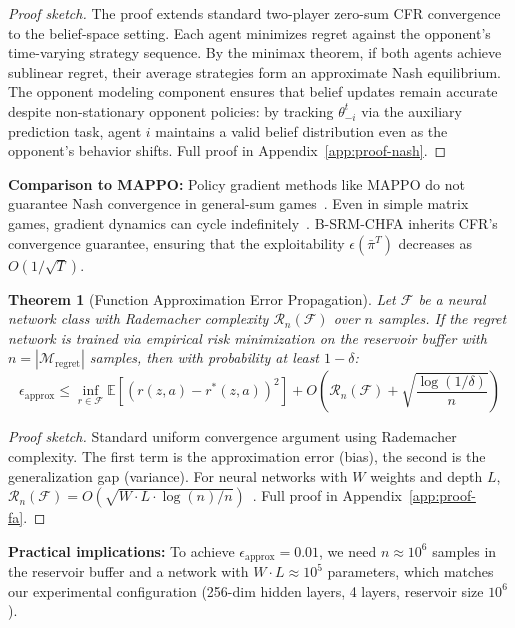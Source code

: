 \documentclass{article}
\newtheorem{theorem}{Theorem}[section]
\begin{document}
\begin{proof}[Proof sketch]
The proof extends standard two-player zero-sum CFR convergence~\cite{zinkevich2007regret} to the belief-space setting. Each agent minimizes regret against the opponent's time-varying strategy sequence. By the minimax theorem, if both agents achieve sublinear regret, their average strategies form an approximate Nash equilibrium. The opponent modeling component ensures that belief updates remain accurate despite non-stationary opponent policies: by tracking $\theta_{-i}^t$ via the auxiliary prediction task, agent $i$ maintains a valid belief distribution even as the opponent's behavior shifts. Full proof in Appendix~\ref{app:proof-nash}.
\end{proof}

\textbf{Comparison to MAPPO:} Policy gradient methods like MAPPO do not guarantee Nash convergence in general-sum games~\cite{daskalakis2020complexity}. Even in simple matrix games, gradient dynamics can cycle indefinitely~\cite{balduzzi2018mechanics}. B-SRM-CHFA inherits CFR's convergence guarantee, ensuring that the exploitability $\epsilon(\bar{\pi}^T)$ decreases as $O(1/\sqrt{T})$.

\begin{theorem}[Function Approximation Error Propagation]
\label{thm:fa-error}
Let $\mathcal{F}$ be a neural network class with Rademacher complexity $\mathcal{R}_n(\mathcal{F})$ over $n$ samples. If the regret network is trained via empirical risk minimization on the reservoir buffer with $n = |\mathcal{M}_{\text{regret}}|$ samples, then with probability at least $1 - \delta$:
\begin{equation}
\epsilon_{\text{approx}} \leq \inf_{r \in \mathcal{F}} \mathbb{E}[(r(z,a) - r^*(z,a))^2] + O\left(\mathcal{R}_n(\mathcal{F}) + \sqrt{\frac{\log(1/\delta)}{n}}\right)
\end{equation}
\end{theorem}

\begin{proof}[Proof sketch]
Standard uniform convergence argument using Rademacher complexity. The first term is the approximation error (bias), the second is the generalization gap (variance). For neural networks with $W$ weights and depth $L$, $\mathcal{R}_n(\mathcal{F}) = O(\sqrt{W \cdot L \cdot \log(n) / n})$~\cite{golowich2018size}. Full proof in Appendix~\ref{app:proof-fa}.
\end{proof}

\textbf{Practical implications:} To achieve $\epsilon_{\text{approx}} = 0.01$, we need $n \approx 10^6$ samples in the reservoir buffer and a network with $W \cdot L \approx 10^5$ parameters, which matches our experimental configuration (256-dim hidden layers, 4 layers, reservoir size $10^6$).
\end{document}
